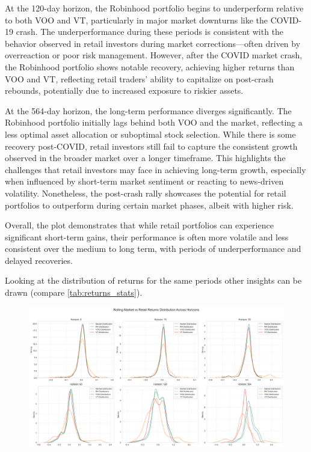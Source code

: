 At the 120-day horizon, the Robinhood portfolio begins to underperform relative to both VOO and VT, particularly in major market downturns like the COVID-19 crash. The underperformance during these periods is consistent with the behavior observed in retail investors during market corrections—often driven by overreaction or poor risk management. However, after the COVID market crash, the Robinhood portfolio shows notable recovery, achieving higher returns than VOO and VT, reflecting retail traders' ability to capitalize on post-crash rebounds, potentially due to increased exposure to riskier assets.

At the 564-day horizon, the long-term performance diverges significantly. The Robinhood portfolio initially lags behind both VOO and the market, reflecting a less optimal asset allocation or suboptimal stock selection. While there is some recovery post-COVID, retail investors still fail to capture the consistent growth observed in the broader market over a longer timeframe. This highlights the challenges that retail investors may face in achieving long-term growth, especially when influenced by short-term market sentiment or reacting to news-driven volatility. Nonetheless, the post-crash rally showcases the potential for retail portfolios to outperform during certain market phases, albeit with higher risk.

Overall, the plot demonstrates that while retail portfolios can experience significant short-term gains, their performance is often more volatile and less consistent over the medium to long term, with periods of underperformance and delayed recoveries.

Looking at the distribution of returns for the same periods other insights can be drawn (compare \ref{tab:returns_stats}). 

\begin{figure}[h!]
    \centering
    \includegraphics[width=1\linewidth]{Images/distributions_comparison.png}
\end{figure}

